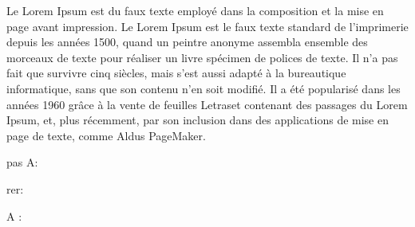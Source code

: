 \documentclass{article}
\begin{document}
\renewcommand{\showlemma}[1]{\emph{#1}}
\beginnumbering
\pstart
Le Lorem Ipsum est  du faux texte employé dans la  composition et la mise en page avant impression. Le Lorem Ipsum est le faux texte standard de l'imprimerie depuis les années 1500, quand un peintre anonyme assembla ensemble des morceaux de texte pour réaliser un livre spécimen de polices de texte. Il n'a pas fait que survivre cinq siècles, mais s'est aussi adapté à la bureautique informatique, sans que son contenu n'en soit modifié. Il a été popularisé dans les années 1960 grâce à la vente de feuilles Letraset contenant des passages du Lorem Ipsum, et, plus récemment, par son inclusion dans des applications de mise en page de texte, comme Aldus PageMaker.
\pend
\endnumbering

pas A:

rer:

A :
\end{document}

